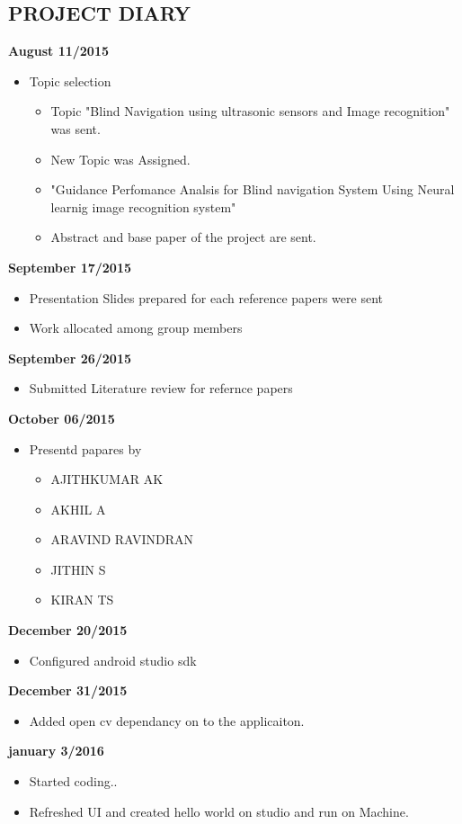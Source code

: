 \documentclass[11pt,a4paper,twoside]{report}
\begin{document}
\begin{appendix}
\section{PROJECT DIARY}
\begin{flushleft}

\textbf{August 11/2015}\\
\begin{itemize}
\item Topic selection
\begin{itemize}
\item Topic "Blind Navigation using ultrasonic sensors and Image recognition" was sent.
\item New Topic was Assigned.
\item "Guidance Perfomance Analsis for Blind navigation System Using Neural learnig image recognition system"

\item Abstract and base paper of the project are sent.
\end{itemize}
\end{itemize}
\textbf{September 17/2015}\\
\begin{itemize}
\item Presentation Slides prepared for each reference papers were sent\\

\item Work allocated among group members
\end{itemize}
\textbf{September 26/2015}\\
\begin{itemize}
\item Submitted Literature review for refernce papers
\end{itemize}
\textbf{
October 06/2015}\\
\begin{itemize}
\item Presentd papares by
\begin{itemize}
\item AJITHKUMAR AK
\item AKHIL A
\item ARAVIND RAVINDRAN
\item JITHIN S
\item KIRAN TS
\end{itemize}
\end{itemize}
\textbf{December 20/2015}\\
\begin{itemize}
\item Configured android studio sdk
\end{itemize}
\textbf{December 31/2015}
\begin{itemize}
\item Added open cv dependancy on to the applicaiton.
\end{itemize}
\newpage
\textbf{january 3/2016}
\begin{itemize}
\item Started coding..
\item Refreshed UI and created hello world on studio and run on Machine.


\end{itemize}
\end{flushleft}
\end{appendix}
\end{document}
